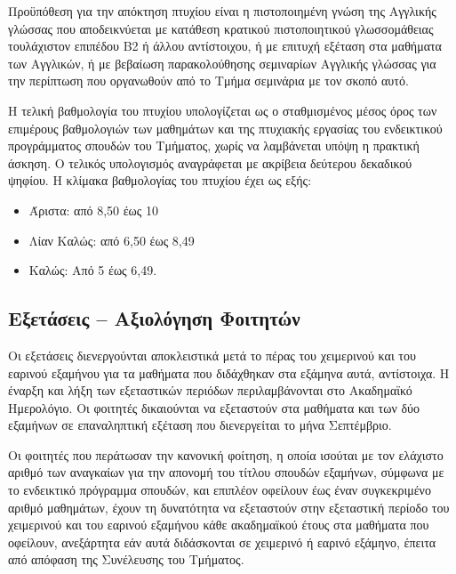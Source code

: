 Προϋπόθεση για την απόκτηση πτυχίου είναι η πιστοποιημένη γνώση της
Αγγλικής γλώσσας που αποδεικνύεται με κατάθεση κρατικού πιστοποιητικού
γλωσσομάθειας τουλάχιστον επιπέδου Β2 ή άλλου αντίστοιχου, ή με επιτυχή
εξέταση στα μαθήματα των Αγγλικών, ή με βεβαίωση παρακολούθησης
σεμιναρίων Αγγλικής γλώσσας για την περίπτωση που οργανωθούν από το
Τμήμα σεμινάρια με τον σκοπό αυτό.

Η τελική βαθμολογία του πτυχίου υπολογίζεται ως ο σταθμισμένος μέσος
όρος των επιμέρους βαθμολογιών των μαθημάτων και της πτυχιακής εργασίας
του ενδεικτικού προγράμματος σπουδών του Τμήματος, χωρίς να λαμβάνεται
υπόψη η πρακτική άσκηση. Ο τελικός υπολογισμός αναγράφεται με ακρίβεια
δεύτερου δεκαδικού ψηφίου. Η κλίμακα βαθμολογίας του πτυχίου έχει ως
εξής:

\begin{itemize}
\tightlist
\item
  Άριστα: από 8,50 έως 10
\item
  Λίαν Καλώς: από 6,50 έως 8,49
\item
  Καλώς: Από 5 έως 6,49.
\end{itemize}

\hypertarget{ux3b5ux3beux3b5ux3c4ux3acux3c3ux3b5ux3b9ux3c2-ux3b1ux3beux3b9ux3bfux3bbux3ccux3b3ux3b7ux3c3ux3b7-ux3c6ux3bfux3b9ux3c4ux3b7ux3c4ux3ceux3bd}{%
\subsection{Εξετάσεις -- Αξιολόγηση
Φοιτητών}\label{ux3b5ux3beux3b5ux3c4ux3acux3c3ux3b5ux3b9ux3c2-ux3b1ux3beux3b9ux3bfux3bbux3ccux3b3ux3b7ux3c3ux3b7-ux3c6ux3bfux3b9ux3c4ux3b7ux3c4ux3ceux3bd}}

Οι εξετάσεις διενεργούνται αποκλειστικά μετά το πέρας του χειμερινού και
του εαρινού εξαμήνου για τα μαθήματα που διδάχθηκαν στα εξάμηνα αυτά,
αντίστοιχα. Η έναρξη και λήξη των εξεταστικών περιόδων περιλαμβάνονται
στο Ακαδημαϊκό Ημερολόγιο. Οι φοιτητές δικαιούνται να εξεταστούν στα
μαθήματα και των δύο εξαμήνων σε επαναληπτική εξέταση που διενεργείται
το μήνα Σεπτέμβριο.

Οι φοιτητές που περάτωσαν την κανονική φοίτηση, η οποία ισούται με τον
ελάχιστο αριθμό των αναγκαίων για την απονομή του τίτλου σπουδών
εξαμήνων, σύμφωνα με το ενδεικτικό πρόγραμμα σπουδών, και επιπλέον
οφείλουν έως έναν συγκεκριμένο αριθμό μαθημάτων, έχουν τη δυνατότητα να
εξεταστούν στην εξεταστική περίοδο του χειμερινού και του εαρινού
εξαμήνου κάθε ακαδημαϊκού έτους στα μαθήματα που οφείλουν, ανεξάρτητα
εάν αυτά διδάσκονται σε χειμερινό ή εαρινό εξάμηνο, έπειτα από απόφαση
της Συνέλευσης του Τμήματος.

